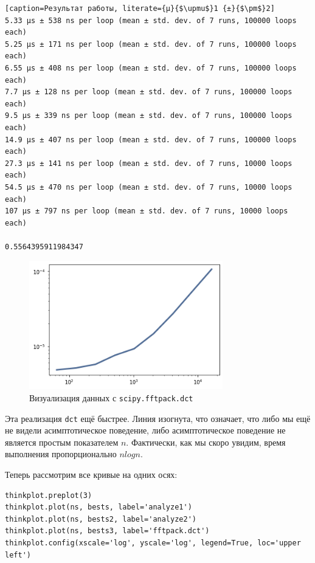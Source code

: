 \documentclass[a4paper,12pt]{report}
\begin{document}
\begin{lstlisting}[caption=Результат работы, literate={µ}{$\upmu$}1 {±}{$\pm$}2]
5.33 µs ± 538 ns per loop (mean ± std. dev. of 7 runs, 100000 loops each)
5.25 µs ± 171 ns per loop (mean ± std. dev. of 7 runs, 100000 loops each)
6.55 µs ± 408 ns per loop (mean ± std. dev. of 7 runs, 100000 loops each)
7.7 µs ± 128 ns per loop (mean ± std. dev. of 7 runs, 100000 loops each)
9.5 µs ± 339 ns per loop (mean ± std. dev. of 7 runs, 100000 loops each)
14.9 µs ± 407 ns per loop (mean ± std. dev. of 7 runs, 100000 loops each)
27.3 µs ± 141 ns per loop (mean ± std. dev. of 7 runs, 10000 loops each)
54.5 µs ± 470 ns per loop (mean ± std. dev. of 7 runs, 10000 loops each)
107 µs ± 797 ns per loop (mean ± std. dev. of 7 runs, 10000 loops each)

0.5564395911984347
\end{lstlisting}

\begin{figure}[H]
        \centering
        \includegraphics[width=0.75\textwidth]{lab6_fig1_3.png}
        \caption{Визуализация данных с \texttt{scipy.fftpack.dct}}
        \label{fig:lab6_fig1_3}
\end{figure}

Эта реализация \texttt{dct} ещё быстрее. Линия изогнута, что означает, что либо мы ещё не видели асимптотическое поведение, либо асимптотическое поведение не является простым показателем $n$. Фактически, как мы скоро увидим, время выполнения пропорционально $nlogn$.

Теперь рассмотрим все кривые на одних осях:

\begin{lstlisting}[caption=Визуализация всех кривых]
thinkplot.preplot(3)
thinkplot.plot(ns, bests, label='analyze1')
thinkplot.plot(ns, bests2, label='analyze2')
thinkplot.plot(ns, bests3, label='fftpack.dct')
thinkplot.config(xscale='log', yscale='log', legend=True, loc='upper left')
\end{lstlisting}
\end{document}
